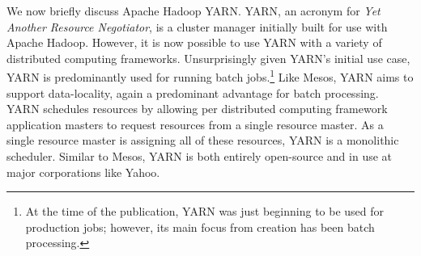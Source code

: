 We now briefly discuss Apache Hadoop YARN. YARN, an acronym for \textit{Yet Another
Resource Negotiator}, is a cluster manager initially built for use with Apache
Hadoop.\cite[pg. 1]{yarn} However, it is now possible to use YARN with a variety
of distributed computing frameworks. Unsurprisingly given YARN's initial use
case, YARN is predominantly used for running batch jobs.\footnote{At the time of
the publication, YARN was just beginning to be used for production jobs;
however, its main focus from creation has been batch processing.\cite[pg.
11]{yarn}} Like Mesos, YARN aims to support data-locality,
again a predominant advantage for batch processing.\cite[pg. 3]{yarn} YARN
schedules resources by allowing per distributed computing framework application
masters to request resources from a single resource master.\cite[pg. 5]{yarn} As
a single resource master is assigning all of these resources, YARN is a
monolithic scheduler. Similar to Mesos, YARN is both entirely open-source and in use
at major corporations like Yahoo.\cite[pg. 9]{yarn}

